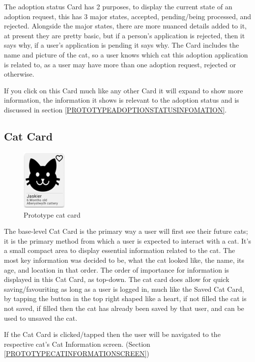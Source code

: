 The adoption status \gls{Card} has 2 purposes, to display the current state of an adoption request, this has 3 major states, accepted, pending/being processed, and rejected. Alongside the major states, there are more nuanced details added to it, at present they are pretty basic, but if a person's application is rejected, then it says why, if a user's application is pending it says why. The \gls{Card} includes the name and picture of the cat, so a user knows which cat this adoption application is related to, as a user may have more than one adoption request, rejected or otherwise.

If you click on this \gls{Card} much like any other \gls{Card} it will expand to show more information, the information it shows is relevant to the adoption status and is discussed in section \ref{PROTOTYPEADOPTIONSTATUSINFOMATION}.

\subsection{Cat Card}\label{PROTOTYPECATCARD}

\begin{figure} [htbp!]
    \centering
    \includegraphics[height=3cm]{Images/PrototypeCatCard.png}
    \caption{Prototype cat card}
    \label{fig:prototype_cat_card}
\end{figure}

The base-level Cat \gls{Card} is the primary way a user will first see their future cats; it is the primary method from which a user is expected to interact with a cat. It's a small compact area to display essential information related to the cat. The most key information was decided to be, what the cat looked like, the name, its age, and location in that order. The order of importance for information is displayed in this Cat \gls{Card}, as top-down. The cat card does allow for quick saving/favouriting as long as a user is logged in, much like the Saved Cat \gls{Card}, by tapping the button in the top right shaped like a heart, if not filled the cat is not saved, if filled then the cat has already been saved by that user, and can be used to unsaved the cat.

If the Cat \gls{Card} is clicked/tapped then the user will be navigated to the respective cat's Cat Information screen. (Section \ref{PROTOTYPECATINFORMATIONSCREEN})
